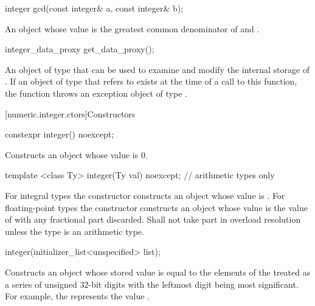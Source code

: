 \begin{addedblock}
\begin{itemdecl}
integer gcd(const integer& a, const integer& b);
\end{itemdecl}

\begin{itemdescr}
\returns An object whose value is the greatest common denominator of  and .
\end{itemdescr}

\begin{itemdecl}
integer_data_proxy get_data_proxy();
\end{itemdecl}

\begin{itemdescr}
\returns An object of type  that can be used to examine and modify the internal storage of . If an object of type  that refers to  exists at the time of a call to this function, the function throws an exception object of type .
\end{itemdescr}

[numeric.integer.ctors]{Constructors}

\begin{itemdecl}
constexpr integer() noexcept;
\end{itemdecl}

\begin{itemdescr}
\effects Constructs an object whose value is 0.
\end{itemdescr}

\begin{itemdecl}
template <class Ty>
  integer(Ty val) noexcept; // arithmetic types only
\end{itemdecl}

\begin{itemdescr}
\effects For integral types the constructor constructs an object whose value is . For floating-point types the constructor constructs an object whose value is the value of  with any fractional part discarded. Shall not take part in overload resolution unless the type  is an arithmetic type.
\end{itemdescr}

\begin{itemdecl}
integer(initializer_list<unspecified> list);
\end{itemdecl}

\begin{itemdescr}
\effects Constructs an object whose stored value is equal to the elements of the  treated as a series of unsigned 32-bit digits with the leftmost digit being most significant. For example, the  represents the value .
\end{itemdescr}


\end{addedblock}
